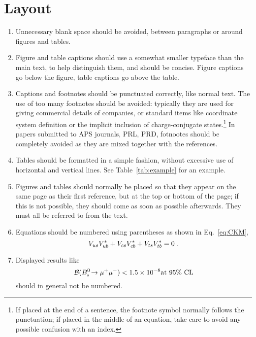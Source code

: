 \section{Layout}

\begin{enumerate}

\item Unnecessary blank space should be avoided, between paragraphs or
  around figures and tables.

\item Figure and table captions should use a somewhat smaller typeface
  than the main text, to help distinguish them, and should be concise.
  Figure captions go below the figure, table captions go above the
  table.

\item Captions and footnotes should be punctuated correctly, like
  normal text. The use of too many footnotes should be avoided:
  typically they are used for giving commercial details of companies,
  or standard items like coordinate system definition or the implicit
  inclusion of charge-conjugate states.\footnote{If placed at the end
    of a sentence, the footnote symbol normally follows the
    punctuation; if placed in the middle of an equation, take care to
    avoid any possible confusion with an index.} In papers submitted
  to APS journals, \eg PRL, PRD, fotnootes should be completely
  avoided as they are mixed together with the references.

\item Tables should be formatted in a simple fashion, without
  excessive use of horizontal and vertical lines. See
  Table~\ref{tab:example} for an example.

\item Figures and tables should normally be placed so that they appear
  on the same page as their first reference, but at the top or bottom
  of the page; if this is not possible, they should come as soon as
  possible afterwards.  They must all be referred to from the text.

\item Equations should be numbered using parentheses as shown in
  Eq.~\ref{eq:CKM},
  \begin{equation}
    \label{eq:CKM}
    V_{us}V_{ub}^* + 
    V_{cs}V_{cb}^* + 
    V_{ts}V_{tb}^* = 0 \ . 
  \end{equation}
  
\item Displayed results like
  \begin{equation*}
    {\ensuremath{\cal B}}(B^0_s\!\rightarrow \mu^+\mu^-) < 1.5 \times 10^{-8} \text{at 95\% CL}
  \end{equation*}
  should in general not be numbered.


\end{enumerate}
